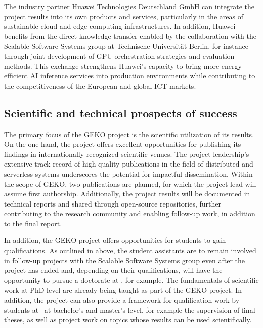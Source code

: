 The industry partner Huawei Technologies Deutschland GmbH can integrate the project results into its own products and services, particularly in the areas of sustainable cloud and edge computing infrastructures. In addition, Huawei benefits from the direct knowledge transfer enabled by the collaboration with the Scalable Software Systems group at Technische Universität Berlin, for instance through joint development of GPU orchestration strategies and evaluation methods. This exchange strengthens Huawei's capacity to bring more energy-efficient AI inference services into production environments while contributing to the competitiveness of the European and global ICT markets.

\subsection{Scientific and technical prospects of success}
\label{sec:verwertungsplan:wissenschaft}


The primary focus of the GEKO project is the scientific utilization of its results.
On the one hand, the project offers excellent opportunities for publishing its findings in internationally recognized scientific venues.
The project leadership's extensive track record of high-quality publications in the field of distributed and serverless systems underscores the potential for impactful dissemination.
Within the scope of GEKO, two publications are planned, for which the project lead will assume first authorship.
Additionally, the project results will be documented in technical reports and shared through open-source repositories, further contributing to the research community and enabling follow-up work, in addition to the final report.

In addition, the GEKO project offers opportunities for students to gain qualifications.
As outlined in above, the student assistants are to remain involved in follow-up projects with the Scalable Software Systems group even after the project has ended and, depending on their qualifications, will have the opportunity to pursue a doctorate at \TU{}, for example.
The fundamentals of scientific work at PhD level are already being taught as part of the GEKO project.
In addition, the project can also provide a framework for qualification work by students at \TU\ at bachelor's and master's level, for example the supervision of final theses, as well as project work on topics whose results can be used scientifically.

